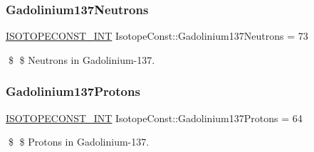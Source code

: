\subsubsection{\texorpdfstring{Gadolinium137\+Neutrons}{Gadolinium137Neutrons}}
{\footnotesize\ttfamily \mbox{\hyperlink{group___isotope_const-_macros_ga5f18360b3e99483a35c32d789e62621c}{I\+S\+O\+T\+O\+P\+E\+C\+O\+N\+S\+T\+\_\+\+I\+NT}} Isotope\+Const\+::\+Gadolinium137\+Neutrons = 73}

\$ \$ Neutrons in Gadolinium-\/137. \mbox{\label{group___isotope_const-_gadolinium-_gd137_gae89265c40fb7e35e5e0aa9b0f3fb9ebb}} 
\subsubsection{\texorpdfstring{Gadolinium137\+Protons}{Gadolinium137Protons}}
{\footnotesize\ttfamily \mbox{\hyperlink{group___isotope_const-_macros_ga5f18360b3e99483a35c32d789e62621c}{I\+S\+O\+T\+O\+P\+E\+C\+O\+N\+S\+T\+\_\+\+I\+NT}} Isotope\+Const\+::\+Gadolinium137\+Protons = 64}

\$ \$ Protons in Gadolinium-\/137. 